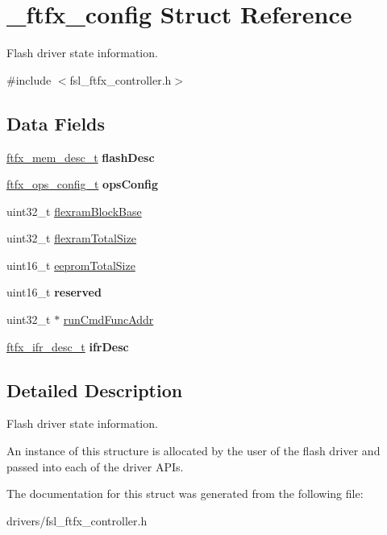 \hypertarget{struct__ftfx__config}{}\section{\+\_\+ftfx\+\_\+config Struct Reference}
\label{struct__ftfx__config}


Flash driver state information.  




{\ttfamily \#include $<$fsl\+\_\+ftfx\+\_\+controller.\+h$>$}

\subsection*{Data Fields}
\begin{DoxyCompactItemize}
\item 
\mbox{\hyperlink{group__ftfx__controller_ga64a01792d0090fb0202473c138e0c2c9}{ftfx\+\_\+mem\+\_\+desc\+\_\+t}} {\bfseries flash\+Desc}
\item 
\mbox{\hyperlink{group__ftfx__controller_ga721d5f2f64785b7580862e942e17737e}{ftfx\+\_\+ops\+\_\+config\+\_\+t}} {\bfseries ops\+Config}
\item 
uint32\+\_\+t \mbox{\hyperlink{group__ftfx__controller_gaf29349209247a3a0420431c52be97f28}{flexram\+Block\+Base}}
\item 
uint32\+\_\+t \mbox{\hyperlink{group__ftfx__controller_ga29c215db16af5f9ff6c5c759ab1c889b}{flexram\+Total\+Size}}
\item 
uint16\+\_\+t \mbox{\hyperlink{group__ftfx__controller_gaad84e8b697ff1b5fbe263e3730140d79}{eeprom\+Total\+Size}}
\item 
uint16\+\_\+t {\bfseries reserved}
\item 
uint32\+\_\+t $\ast$ \mbox{\hyperlink{group__ftfx__controller_ga6ec241fed36ff39637ec3a69f34e5e84}{run\+Cmd\+Func\+Addr}}
\item 
\mbox{\hyperlink{group__ftfx__controller_ga25d8176fbbb387ae5e5ba3fa32667d72}{ftfx\+\_\+ifr\+\_\+desc\+\_\+t}} {\bfseries ifr\+Desc}
\end{DoxyCompactItemize}


\subsection{Detailed Description}
Flash driver state information. 

An instance of this structure is allocated by the user of the flash driver and passed into each of the driver A\+P\+Is. 

The documentation for this struct was generated from the following file\+:\begin{DoxyCompactItemize}
\item 
drivers/fsl\+\_\+ftfx\+\_\+controller.\+h\end{DoxyCompactItemize}
